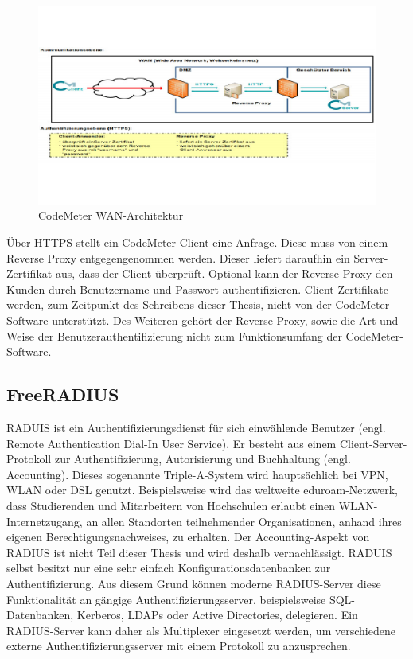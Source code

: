 \documentclass[11pt,a4paper]{report}
\begin{document}
\begin{figure}[htbp]
\centering
\includegraphics[scale=1.2]{images/codemeter_wan.pdf}
\caption{CodeMeter WAN-Architektur}
\label{fig:radius_access}
\end{figure}

Über HTTPS stellt ein CodeMeter-Client eine Anfrage. Diese muss von einem Reverse Proxy entgegengenommen werden. Dieser liefert daraufhin ein Server-Zertifikat aus, dass der Client überprüft. Optional kann der Reverse Proxy den Kunden durch Benutzername und Passwort authentifizieren. Client-Zertifikate werden, zum Zeitpunkt des Schreibens dieser Thesis, nicht von der CodeMeter-Software unterstützt. Des Weiteren gehört der Reverse-Proxy, sowie die Art und Weise der Benutzerauthentifizierung nicht zum Funktionsumfang der CodeMeter-Software. 

\subsection{FreeRADIUS}

RADUIS ist ein Authentifizierungsdienst für sich einwählende Benutzer (engl. Remote Authentication Dial-In User Service). Er besteht aus einem Client-Server-Protokoll zur Authentifizierung, Autorisierung und Buchhaltung (engl. Accounting). Dieses sogenannte Triple-A-System wird hauptsächlich bei VPN, WLAN oder DSL genutzt. Beispielsweise wird das weltweite eduroam-Netzwerk, dass Studierenden und Mitarbeitern von Hochschulen erlaubt einen WLAN-Internetzugang, an allen Standorten teilnehmender Organisationen, anhand ihres eigenen Berechtigungsnachweises, zu erhalten. Der Accounting-Aspekt von RADIUS ist nicht Teil dieser Thesis und wird deshalb vernachlässigt. RADUIS selbst besitzt nur eine sehr einfach Konfigurationsdatenbanken zur Authentifizierung. Aus diesem Grund können moderne RADIUS-Server diese Funktionalität an gängige Authentifizierungsserver, beispielsweise SQL-Datenbanken, Kerberos, LDAPs oder Active Directories, delegieren. Ein RADIUS-Server kann daher als Multiplexer eingesetzt werden, um verschiedene externe Authentifizierungsserver mit einem Protokoll zu anzusprechen.
\end{document}

